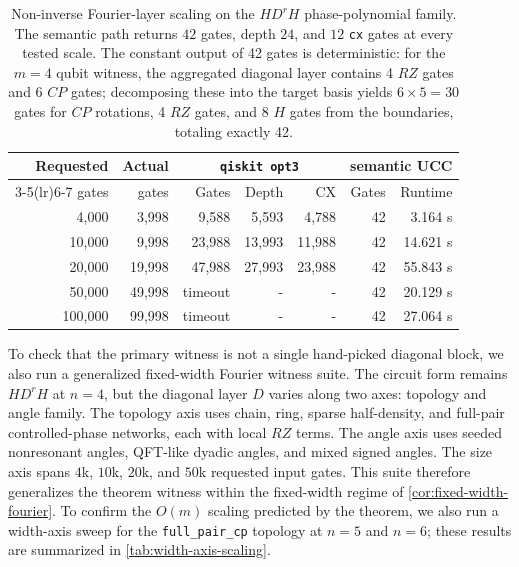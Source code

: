 \documentclass[11pt]{article}
\begin{document}
\begin{table}[tbp]
\centering
\begin{tabular}{rrrrrrr}
\toprule
Requested & Actual & \multicolumn{3}{c}{\texttt{qiskit opt3}} & \multicolumn{2}{c}{semantic UCC} \\
\cmidrule(lr){3-5}\cmidrule(lr){6-7}
gates & gates & Gates & Depth & CX & Gates & Runtime \\
\midrule
4{,}000 & 3{,}998 & 9{,}588 & 5{,}593 & 4{,}788 & 42 & 3.164 s \\
10{,}000 & 9{,}998 & 23{,}988 & 13{,}993 & 11{,}988 & 42 & 14.621 s \\
20{,}000 & 19{,}998 & 47{,}988 & 27{,}993 & 23{,}988 & 42 & 55.843 s \\
50{,}000 & 49{,}998 & timeout & - & - & 42 & 20.129 s \\
100{,}000 & 99{,}998 & timeout & - & - & 42 & 27.064 s \\
\bottomrule
\end{tabular}
\caption{Non-inverse Fourier-layer scaling on the $H D^r H$ phase-polynomial family. The semantic path returns $42$ gates, depth $24$, and $12$ \texttt{cx} gates at every tested scale. The constant output of 42 gates is deterministic: for the $m=4$ qubit witness, the aggregated diagonal layer contains 4 $RZ$ gates and 6 $CP$ gates; decomposing these into the target basis yields $6 \times 5 = 30$ gates for $CP$ rotations, 4 $RZ$ gates, and 8 $H$ gates from the boundaries, totaling exactly 42.}
\label{tab:fourier-phase-sandwich}
\end{table}

To check that the primary witness is not a single hand-picked diagonal block,
we also run a generalized fixed-width Fourier witness suite. The circuit form
remains $H D^r H$ at $n=4$, but the diagonal layer $D$ varies along two axes:
topology and angle family. The topology axis uses chain, ring, sparse
half-density, and full-pair controlled-phase networks, each with local $RZ$
terms. The angle axis uses seeded nonresonant angles, QFT-like dyadic angles,
and mixed signed angles. The size axis spans $4$k, $10$k, $20$k, and $50$k
requested input gates. This suite therefore generalizes the theorem witness
within the fixed-width regime of \cref{cor:fixed-width-fourier}.
To confirm the $O(m)$ scaling predicted by the theorem, we also run a width-axis sweep
for the \texttt{full\_pair\_cp} topology at $n=5$ and $n=6$; these results are
summarized in \cref{tab:width-axis-scaling}.
\end{document}
